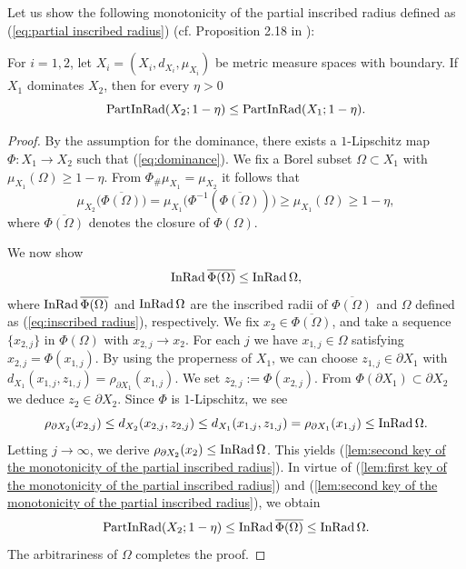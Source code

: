 Let us show the following monotonicity of the partial inscribed radius defined as (\ref{eq:partial inscribed radius}) (cf. Proposition 2.18 in \cite{Sh}):
\begin{lem}\label{lem:monotonicity of the partial inscribed radius}
For $i=1,2$,
let $X_{i}=(X_{i},d_{X_{i}},\mu_{X_{i}})$ be metric measure spaces with boundary.
If $X_{1}$ dominates $X_{2}$,
then for every $\eta>0$
\begin{equation*}
\operatorname{PartInRad}(X_{2};1-\eta)\leq \operatorname{PartInRad}(X_{1};1-\eta).
\end{equation*}
\end{lem}
\begin{proof}
By the assumption for the dominance,
there exists a $1$-Lipschitz map $\Phi:X_{1}\to X_{2}$ such that (\ref{eq:dominance}).
We fix a Borel subset $\Omega \subset X_{1}$ with $\mu_{X_{1}}(\Omega)\geq 1-\eta$.
From $\Phi_{\#}\mu_{X_{1}}=\mu_{X_{2}}$
it follows that
\begin{equation}\label{lem:first key of the monotonicity of the partial inscribed radius}
\mu_{X_{2}}\bigl( \overline{\Phi(\Omega)}  \bigl)=\mu_{X_{1}}\bigl(\Phi^{-1}(\overline{\Phi(\Omega)} )\bigl) \geq \mu_{X_{1}}(\Omega)\geq 1-\eta,
\end{equation}
where $\overline{\Phi(\Omega)}$ denotes the closure of $\Phi(\Omega)$.

We now show
\begin{equation}\label{lem:second key of the monotonicity of the partial inscribed radius}
\operatorname{InRad} \overline{\Phi(\Omega)} \leq \operatorname{InRad} \Omega,
\end{equation}
where $\operatorname{InRad} \overline{\Phi(\Omega)}$ and $\operatorname{InRad} \Omega$ are the inscribed radii of $\overline{\Phi(\Omega)}$ and $\Omega$ defined as (\ref{eq:inscribed radius}),
respectively.
We fix $x_{2}\in \overline{\Phi(\Omega)}$,
and take a sequence $\{ x_{2,j} \}$ in $\Phi(\Omega)$ with $x_{2,j}\to x_{2}$.
For each $j$
we have $x_{1,j}\in \Omega$ satisfying $x_{2,j}=\Phi(x_{1,j})$.
By using the properness of $X_{1}$,
we can choose $z_{1,j}\in \partial X_{1}$ with $d_{X_{1}}(x_{1,j},z_{1,j})=\rho_{\partial X_{1}}(x_{1,j})$.
We set $z_{2,j}:=\Phi(x_{2,j})$.
From $\Phi(\partial X_{1})\subset \partial X_{2}$
we deduce $z_{2} \in \partial X_{2}$.
Since $\Phi$ is $1$-Lipschitz,
we see
\begin{equation*}
\rho_{\partial X_{2}}(x_{2,j})\leq d_{X_{2}}(x_{2,j},z_{2,j})\leq d_{X_{1}}(x_{1,j},z_{1,j})=\rho_{\partial X_{1}}(x_{1,j})\leq \operatorname{InRad} \Omega.
\end{equation*}
Letting $j\to \infty$,
we derive $\rho_{\partial X_{2}}(x_{2})\leq \operatorname{InRad} \Omega$.
This yields (\ref{lem:second key of the monotonicity of the partial inscribed radius}).
In virtue of (\ref{lem:first key of the monotonicity of the partial inscribed radius}) and (\ref{lem:second key of the monotonicity of the partial inscribed radius}),
we obtain
\begin{equation*}
\operatorname{PartInRad}(X_{2};1-\eta)\leq \operatorname{InRad} \overline{\Phi(\Omega)} \leq \operatorname{InRad} \Omega.
\end{equation*}
The arbitrariness of $\Omega$ completes the proof.
\end{proof}

